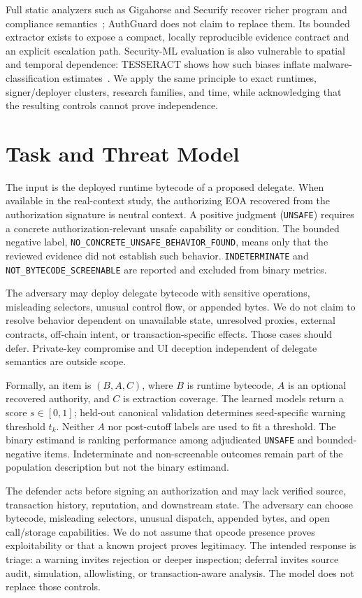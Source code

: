 \documentclass[conference]{IEEEtran}
\newcommand{\code}[1]{\texttt{#1}}
\begin{document}
Full static analyzers such as Gigahorse and Securify recover richer program and compliance
semantics~\cite{gigahorse,securify}; AuthGuard does not claim to replace them. Its bounded extractor
exists to expose a compact, locally reproducible evidence contract and an explicit escalation path.
Security-ML evaluation is also vulnerable to spatial and temporal dependence: TESSERACT shows how
such biases inflate malware-classification estimates~\cite{tesseract}. We apply the same principle
to exact runtimes, signer/deployer clusters, research families, and time, while acknowledging that
the resulting controls cannot prove independence.

\section{Task and Threat Model}

The input is the deployed runtime bytecode of a proposed delegate. When available in the real-context
study, the authorizing EOA recovered from the authorization signature is neutral context. A positive
judgment (\code{UNSAFE}) requires a concrete authorization-relevant unsafe capability or condition.
The bounded negative label, \code{NO\_CONCRETE\_UNSAFE\_BEHAVIOR\_FOUND}, means only that the
reviewed evidence did not establish such behavior. \code{INDETERMINATE} and
\code{NOT\_BYTECODE\_SCREENABLE} are reported and excluded from binary metrics.

The adversary may deploy delegate bytecode with sensitive operations, misleading selectors,
unusual control flow, or appended bytes. We do not claim to resolve behavior dependent on unavailable
state, unresolved proxies, external contracts, off-chain intent, or transaction-specific effects.
Those cases should defer. Private-key compromise and UI deception independent of delegate semantics
are outside scope.

Formally, an item is $(B,A,C)$, where $B$ is runtime bytecode, $A$ is an optional recovered
authority, and $C$ is extraction coverage. The learned models return a score $s\in[0,1]$; held-out
canonical validation determines seed-specific warning threshold $t_k$. Neither $A$ nor post-cutoff
labels are used to fit a threshold. The binary estimand is ranking performance among adjudicated
\code{UNSAFE} and bounded-negative items. Indeterminate and non-screenable outcomes remain part of
the population description but not the binary estimand.

The defender acts before signing an authorization and may lack verified source, transaction
history, reputation, and downstream state. The adversary can choose bytecode, misleading selectors,
unusual dispatch, appended bytes, and open call/storage capabilities. We do not assume that opcode
presence proves exploitability or that a known project proves legitimacy. The intended response is
triage: a warning invites rejection or deeper inspection; deferral invites source audit, simulation,
allowlisting, or transaction-aware analysis. The model does not replace those controls.
\end{document}
